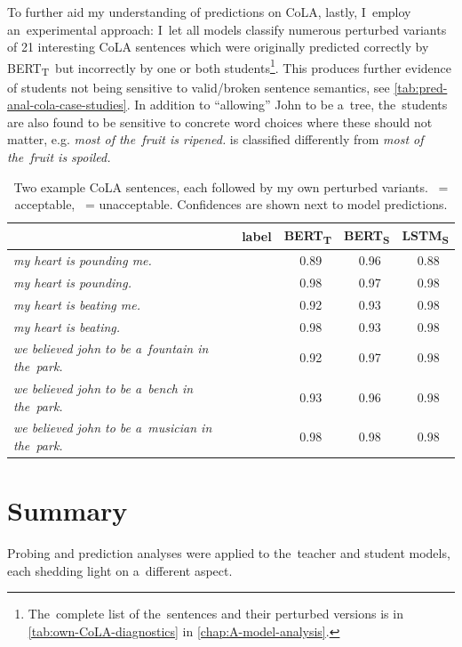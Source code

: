 \documentclass[bsc,frontabs,singlespacing,parskip,deptreport]{infthesis}
\newcommand{\cmark}{\ding{51}}%
\newcommand{\xmark}{\ding{55}}%
\def\BERTT{BERT\textsubscript{T}}
\def\BERTS{BERT\textsubscript{S}}
\def\LSTMS{LSTM\textsubscript{S}}
\begin{document}
{{    To further aid my understanding of predictions on CoLA, lastly, I~employ an~experimental approach: I~let all models classify numerous perturbed variants of 21 interesting CoLA sentences which were originally predicted correctly by \BERTT~but incorrectly by one or both students\footnote{The~complete list of the~sentences and their perturbed versions is in \autoref{tab:own-CoLA-diagnostics} in \autoref{chap:A-model-analysis}.}.
    This produces further evidence of students not being sensitive to valid/broken sentence semantics, see \autoref{tab:pred-anal-cola-case-studies}.
    In addition to ``allowing'' John to be a~tree, the~students are also found to be sensitive to concrete word choices where these should not matter, e.g. \textit{most of the~fruit is ripened.} is classified differently from \textit{most of the~fruit is spoiled.}

    \begin{table}[h!tb]
      \centering
      \footnotesize
      \begin{tabular}{lcccc}
      \toprule
      & label & \BERTT & \BERTS & \LSTMS \\
      \toprule
      \textit{my heart is pounding me. }& \xmark & \xmark~0.89 & \cmark~0.96 & \cmark~0.88 \\
      \textit{my heart is pounding.    }& \cmark & \cmark~0.98 & \cmark~0.97 & \cmark~0.98 \\
      \textit{my heart is beating me.  }& \xmark & \xmark~0.92 & \cmark~0.93 & \cmark~0.98 \\
      \textit{my heart is beating.     }& \cmark & \cmark~0.98 & \cmark~0.93 & \cmark~0.98 \\
      \textit{we believed john to be a~fountain in the~park.}  &\xmark & \xmark~0.92 & \cmark~0.97 & \cmark~0.98 \\
      \textit{we believed john to be a~bench in the~park.   }  &\xmark & \xmark~0.93 & \cmark~0.96 & \cmark~0.98 \\
      \textit{we believed john to be a~musician in the~park.}  &\cmark & \cmark~0.98 & \cmark~0.98 & \cmark~0.98 \\
      \bottomrule
      \end{tabular}
      \caption{Two example CoLA sentences, each followed by my own perturbed variants. \cmark~= acceptable, \xmark~= unacceptable. Confidences are shown next to model predictions.}
      \label{tab:pred-anal-cola-case-studies}
    \end{table}
  }

  \section{Summary}{
    Probing and prediction analyses were applied to the~teacher and student models, each shedding light on a~different aspect.

}}
\end{document}

